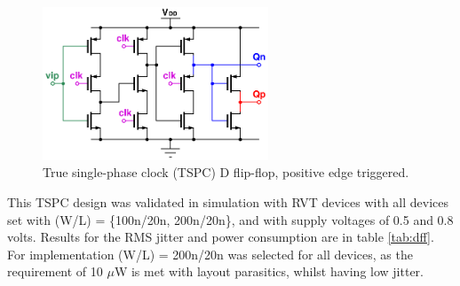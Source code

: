 			\begin{figure}[htb!]
			        \centering
			        \includegraphics[width=0.6\textwidth, angle=0]{./figs/design/tspc_}
			    \caption{True single-phase clock (TSPC) D flip-flop, positive edge triggered.}
			    \label{fig:tspc_dff}
			\end{figure}

		This TSPC design was validated in simulation with RVT devices with all devices set with (W/L) = \{100n/20n, 200n/20n\}, and with supply voltages of 0.5 and 0.8 volts. Results for the RMS jitter and power consumption are in table \ref{tab:dff}. For implementation (W/L) = 200n/20n was selected for all devices, as the requirement of 10 $\mu$W is met with layout parasitics, whilst having low jitter.





